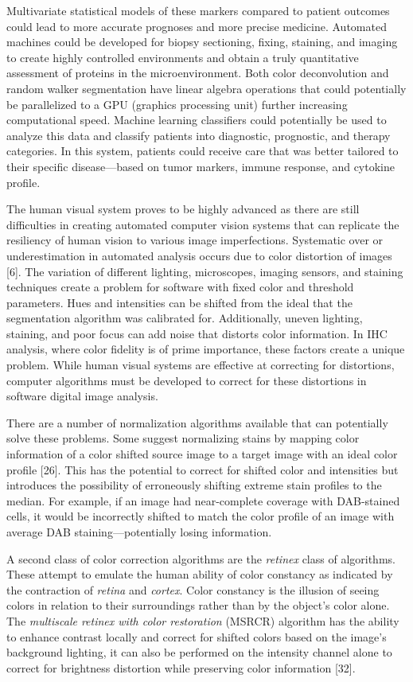 \documentclass[12pt]{article}
\begin{document}
Multivariate statistical models of these markers compared to patient outcomes could lead to
more accurate prognoses and more precise medicine. Automated machines could be developed for
biopsy sectioning, fixing, staining, and imaging to create highly controlled environments and obtain a
truly quantitative assessment of proteins in the microenvironment. Both color deconvolution and
random walker segmentation have linear algebra operations that could potentially be parallelized to a GPU (graphics processing unit) further increasing computational speed. Machine learning classifiers
could potentially be used to analyze this data and classify patients into diagnostic, prognostic, and
therapy categories. In this system, patients could receive care that was better tailored to their specific disease---based
on tumor markers, immune response, and cytokine profile.

The human visual system proves to be highly advanced as there are still difficulties in creating
automated computer vision systems that can replicate the resiliency of human vision to various image
imperfections. Systematic over or underestimation in automated analysis occurs due to color distortion
of images [6]. The variation of different lighting, microscopes, imaging sensors, and staining techniques create a problem for software with fixed color and threshold parameters. Hues and intensities can be shifted from the ideal that the segmentation algorithm was calibrated for. Additionally, uneven lighting, staining, and poor focus can add noise that distorts color information. In
IHC analysis, where color fidelity is of prime importance, these factors create a unique problem. While human visual systems are effective at correcting for distortions, computer algorithms must be developed to correct for these distortions in software digital image analysis.

There are a number of normalization algorithms available that can potentially solve these
problems. Some suggest normalizing stains by mapping color information of a color shifted source
image to a target image with an ideal color profile [26]. This has the potential to correct for shifted
color and intensities but introduces the possibility of erroneously shifting extreme stain profiles to the median. For example, if an image had near-complete coverage with DAB-stained cells, it would be incorrectly shifted to match the color profile of an image with average DAB staining---potentially
losing information.

A second class of color correction algorithms are the \textit{retinex} class of algorithms. These attempt to emulate the human ability of color constancy as indicated by the contraction of \textit{retina} and \textit{cortex}. Color constancy is the illusion of seeing colors in relation to their surroundings rather than by the object's color alone. The \textit{multiscale retinex with color restoration} (MSRCR) algorithm has the ability to enhance contrast locally and correct for shifted colors based on the image's background lighting, it can also be performed on the intensity channel alone to correct for brightness distortion while preserving color information [32].
\end{document}
